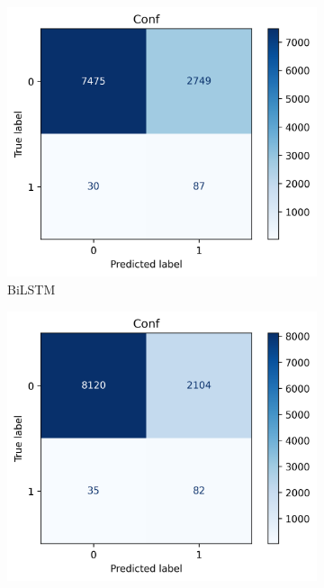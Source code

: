\documentclass[utf8x]{ctexart}
\begin{document}
\begin{figure}[htb]
  \centering
  \begin{subfigure}[b]{0.32\textwidth}
    \centering
    \includegraphics[width=\textwidth]{../images/BiLSTMc_test_conf.png}
    \caption{BiLSTM}
    \label{fig:BiLSTMc_test_conf}
  \end{subfigure}
  \begin{subfigure}[b]{0.32\textwidth}
    \centering
    \includegraphics[width=\textwidth]{../images/BiGRUc_test_conf.png}

\end{subfigure}
\end{figure}
\end{document}
